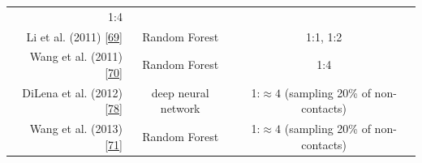 \documentclass[11pt,a4paper,twoside]{book}
\theoremstyle{definition}
\theoremstyle{definition}
\theoremstyle{remark}
\begin{document}
\begin{longtable}[]{@{}rcc@{}}
\begin{minipage}[t]{0.29\columnwidth}
1:4\strut
\end{minipage}\tabularnewline
\begin{minipage}[t]{0.32\columnwidth}\raggedleft\strut
Li et al. (2011) {[}\protect\hyperlink{ref-Li2011}{69}{]}\strut
\end{minipage} & \begin{minipage}[t]{0.19\columnwidth}\centering\strut
Random Forest\strut
\end{minipage} & \begin{minipage}[t]{0.29\columnwidth}\centering\strut
1:1, 1:2\strut
\end{minipage}\tabularnewline
\begin{minipage}[t]{0.32\columnwidth}\raggedleft\strut
Wang et al. (2011) {[}\protect\hyperlink{ref-Wang2011}{70}{]}\strut
\end{minipage} & \begin{minipage}[t]{0.19\columnwidth}\centering\strut
Random Forest\strut
\end{minipage} & \begin{minipage}[t]{0.29\columnwidth}\centering\strut
1:4\strut
\end{minipage}\tabularnewline
\begin{minipage}[t]{0.32\columnwidth}\raggedleft\strut
DiLena et al. (2012) {[}\protect\hyperlink{ref-DiLena2012a}{78}{]}\strut
\end{minipage} & \begin{minipage}[t]{0.19\columnwidth}\centering\strut
deep neural network\strut
\end{minipage} & \begin{minipage}[t]{0.29\columnwidth}\centering\strut
1:\(\approx \!4\) (sampling 20\% of non-contacts)\strut
\end{minipage}\tabularnewline
\begin{minipage}[t]{0.32\columnwidth}\raggedleft\strut
Wang et al. (2013) {[}\protect\hyperlink{ref-Wang2013}{71}{]}\strut
\end{minipage} & \begin{minipage}[t]{0.19\columnwidth}\centering\strut
Random Forest\strut
\end{minipage} & \begin{minipage}[t]{0.29\columnwidth}\centering\strut
1:\(\approx 4\) (sampling 20\% of non-contacts)\strut
\end{minipage}\tabularnewline
\bottomrule
\end{longtable}
\end{document}
